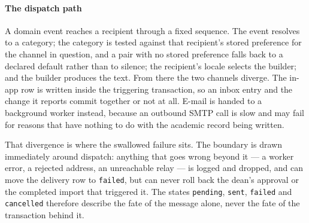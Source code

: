 \paragraph{The dispatch path}
A domain event reaches a recipient through a fixed sequence. The event resolves to a category; the category is tested against that recipient's stored preference for the channel in question, and a pair with no stored preference falls back to a declared default rather than to silence; the recipient's locale selects the builder; and the builder produces the text. From there the two channels diverge. The in-app row is written inside the triggering transaction, so an inbox entry and the change it reports commit together or not at all. E-mail is handed to a background worker instead, because an outbound SMTP call is slow and may fail for reasons that have nothing to do with the academic record being written.

That divergence is where the swallowed failure sits. The boundary is drawn immediately around dispatch: anything that goes wrong beyond it --- a worker error, a rejected address, an unreachable relay --- is logged and dropped, and can move the delivery row to \texttt{failed}, but can never roll back the dean's approval or the completed import that triggered it. The states \texttt{pending}, \texttt{sent}, \texttt{failed} and \texttt{cancelled} therefore describe the fate of the message alone, never the fate of the transaction behind it.
